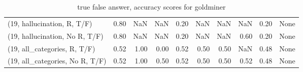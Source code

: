 \begin{table*}[h!]
\begin{adjustbox}{width=2\columnwidth,center}
\begin{tabular}{lrrr|rrr|rrr}
(19, hallucination, R, T/F)           &                      0.80 &                   NaN &                       NaN &                          0.20 &                       NaN &                           NaN &                                    NaN &                               0.20 &                                  None \\
(19, hallucination, No R, T/F)        &                      0.80 &                   NaN &                       NaN &                          0.20 &                       NaN &                           NaN &                                   0.60 &                               0.20 &                                  None \\
(19, all\_categories, R, T/F)          &                      0.52 &                  1.00 &                      0.00 &                          0.52 &                      0.50 &                          0.50 &                                    NaN &                               0.48 &                                  None \\
(19, all\_categories, No R, T/F)       &                      0.52 &                  1.00 &                      0.50 &                          0.52 &                      0.50 &                          0.50 &                                   0.52 &                               0.48 &                                  None \\


\bottomrule
\end{tabular}
\end{adjustbox}
\caption{true false answer, accuracy scores for goldminer}
\end{table*}